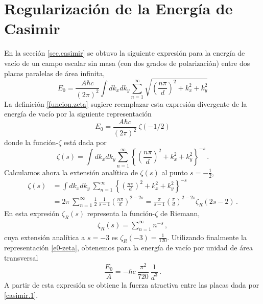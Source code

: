 \section{Regularización de la Energía de Casimir}\label{cap.casimir}

En la sección \ref{sec.casimir} se obtuvo la siguiente expresión para la energía de vacío de un campo escalar sin masa (con dos grados de polarización) entre dos placas paralelas de área infinita,
\begin{equation}
E _0 = \frac{A \hbar c}{(2 \pi) ^2} \int dk _x dk _y 
\sum _{n=1} ^{\infty} 
\sqrt{
		\left( \frac{n \pi}{d} \right) ^2 + k _x ^2 + k _y ^2
		}
\end{equation}
La definición \eqref{funcion.zeta} sugiere reemplazar esta expresión divergente de la energía de vacío por la siguiente representación
\begin{equation}\label{e0-zeta}
E _0 = \frac{A \hbar c}{(2 \pi) ^2} 
\ \zeta (-1/2)
\end{equation}
donde la función-$\zeta$ está dada por
\begin{equation}
\zeta(s) = \int dk _x dk _y 
\sum _{n=1} ^{\infty} 
\left\{\left( \frac{n \pi}{d} \right) ^2 + k _x ^2 + k _y ^2\right\}^{-s}\,.
\end{equation}
Calculamos ahora la extensión analítica de $\zeta(s)$ al punto $s=-\frac12$,
\begin{align}
\zeta (s) &= 
\int dk _x dk _y 
\ \sum _{n=1} ^{\infty} 
\left\{	\left( \frac{n \pi}{d} \right) ^2 + k _x ^2 + k _y ^2
		\right\}^{-s} \nonumber\\[2mm]
&=2\pi\ \sum _{n=1} ^{\infty}  \frac12\,\frac{1}{s-1} \left( \frac{n \pi}{d} \right) ^{2-2s} =
\frac{\pi}{s-1} \left( \frac{\pi}{d} \right) ^{2-2s} \zeta_R (2s-2)\,.
\end{align}
En esta expresión $\zeta_R(s)$ representa la función-$\zeta$ de Riemann,
\begin{align}
	\zeta_R(s)=\sum_{n=1}^\infty n^{-s}\,,
\end{align}
cuya extensión analítica a $s=-3$ es $\zeta_R(-3)=\frac{1}{120}$. Utilizando finalmente la representación \eqref{e0-zeta}, obtenemos para la energía de vacío por unidad de área transversal
\begin{equation}
\frac{E _0}{A} = 
- \hbar c\ \frac{ \pi ^2}{720}\ \frac{1}{d^3}\,.
\end{equation}
A partir de esta expresión se obtiene la fuerza atractiva entre las placas dada por \eqref{casimir.1}.

\bigskip

